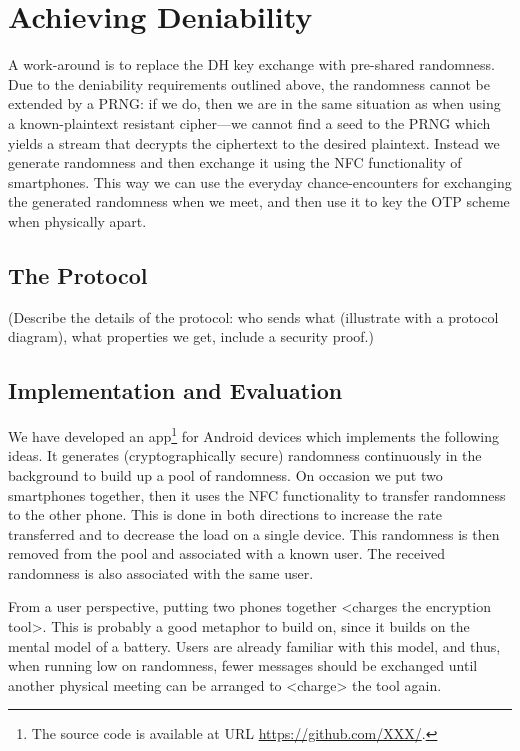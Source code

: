 \section{Achieving Deniability}
\label{sec:otp-kx}

A work-around is to replace the \ac{DH} key exchange with pre-shared 
randomness.
Due to the deniability requirements outlined above, the randomness cannot be 
extended by a \ac{PRNG}: if we do, then we are in the same situation as when 
using a known-plaintext resistant cipher---we cannot find a seed to the 
\ac{PRNG} which yields a stream that decrypts the ciphertext to the desired 
plaintext.
Instead we generate randomness and then exchange it using the \ac{NFC} 
functionality of smartphones.
This way we can use the everyday chance-encounters for exchanging the generated 
randomness when we meet, and then use it to key the \ac{OTP} scheme when 
physically apart.

\subsection{The Protocol}

(Describe the details of the protocol: who sends what (illustrate with 
a protocol diagram), what properties we get, include a security proof.)

\subsection{Implementation and Evaluation}

We have developed an app\footnote{%
  The source code is available at URL \url{https://github.com/XXX/}.
} for Android devices which implements the following ideas.
It generates (cryptographically secure) randomness continuously in the 
background to build up a pool of randomness.
On occasion we put two smartphones together, then it uses the \ac{NFC} 
functionality to transfer randomness to the other phone.
This is done in both directions to increase the rate transferred and to 
decrease the load on a single device.
This randomness is then removed from the pool and associated with a known user.
The received randomness is also associated with the same user.

From a user perspective, putting two phones together <charges the encryption 
tool>.
This is probably a good metaphor to build on, since it builds on the mental 
model of a battery.
Users are already familiar with this model, and thus, when running low on 
randomness, fewer messages should be exchanged until another physical meeting 
can be arranged to <charge> the tool again.

